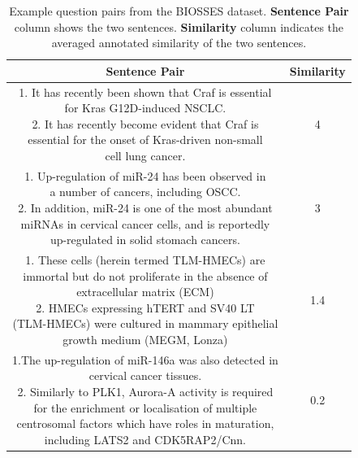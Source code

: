 \begin{enumerate}
	\begin{table}[ht!]
		\centering
			\begin{tabular}{c|c}
				\hline
				\multicolumn{1}{c|}{\textbf{Sentence Pair}} & 
				\multicolumn{1}{c}{\textbf{Similarity}}  \\
				\hline
				\makecell[l]{1. It has recently been shown that Craf is essential \\ for Kras G12D-induced NSCLC. \\ 
					2. It has recently become evident that Craf is \\ essential for the onset of Kras-driven non-small \\ cell lung cancer.} & 4  \\
				\hline
				\makecell[l]{1. Up-regulation of miR-24 has been observed in \\ a number of cancers, including OSCC. \\ 
					2. In addition, miR-24 is one of the most abundant \\ miRNAs in cervical cancer cells, and is reportedly \\ up-regulated in solid stomach cancers. } & 3 \\
				\hline
				\makecell[l]{1. These cells (herein termed TLM-HMECs) are \\ immortal but do not proliferate in the absence of \\ extracellular matrix (ECM) \\  
					2. HMECs expressing hTERT and SV40 LT \\ (TLM-HMECs) were cultured in mammary epithelial \\ growth medium (MEGM, Lonza)  } & 1.4  \\
				\hline
				\makecell[l]{1.The up-regulation of miR-146a was also detected in \\ cervical cancer tissues.  \\ 
					2. Similarly to PLK1, Aurora-A activity is required \\ for the enrichment or localisation of multiple \\ centrosomal  factors which have roles in maturation, \\ including LATS2 and CDK5RAP2/Cnn.} & 0.2  \\
				\hline               
			\end{tabular}
		\caption[Example question pairs from the BIOSSES dataset]{Example question  pairs from the BIOSSES dataset. \textbf{Sentence Pair} column shows the two sentences. \textbf{Similarity} column indicates the averaged annotated similarity of the two sentences.}
		\label{tab:biomeddata}
	\end{table} 


\end{enumerate}
